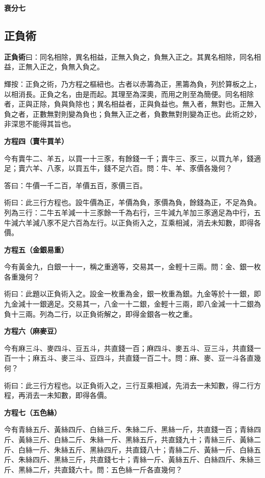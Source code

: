 \documentclass[11pt,a4paper]{article}
\newenvironment{problemenv}[1]{%
  \medskip\noindent\textbf{#1}\par\nopagebreak\smallskip
}{\medskip}
\begin{document}
\begin{problemenv}{衰分七}
\subsection{正負術}

\textbf{正負術}曰：同名相除，異名相益，正無入負之，負無入正之。其異名相除，同名相益，正無入正之，負無入負之。

輝按：正負之術，乃方程之樞紐也。古者以赤籌為正，黑籌為負，列於算板之上，以相消長。正負之名，由是而起。其理至為深奧，而用之則至為簡便。同名相除者，正與正除，負與負除也；異名相益者，正與負益也。無入者，無對也。正無入負之者，正數無對則變為負也；負無入正之者，負數無對則變為正也。此術之妙，非深思不能得其旨也。

\begin{problemenv}{方程四（賣牛買羊）}
今有賣牛二、羊五，以買一十三豕，有餘錢一千；賣牛三、豕三，以買九羊，錢適足；賣六羊、八豕，以買五牛，錢不足六百。問：牛、羊、豕價各幾何？

\textsf{答曰：}牛價一千二百，羊價五百，豕價三百。

\textsf{術曰：}此三行方程也。設牛價為正，羊價為負，豕價為負，餘錢為正，不足為負。列為三行：二牛五羊減一十三豕餘一千為右行，三牛減九羊加三豕適足為中行，五牛減六羊減八豕不足六百為左行。以正負術入之，互乘相減，消去未知數，即得各價。
\end{problemenv}

\begin{problemenv}{方程五（金銀易重）}
今有黃金九，白銀一十一，稱之重適等，交易其一，金輕十三兩。問：金、銀一枚各重幾何？

\textsf{術曰：}此題以正負術入之。設金一枚重為金，銀一枚重為銀。九金等於十一銀，即九金減十一銀適足。交易其一，八金一十二銀，金輕十三兩，即八金減一十二銀為負十三兩。列為二行，以正負術解之，即得金銀各一枚之重。
\end{problemenv}

\begin{problemenv}{方程六（麻麥豆）}
今有麻三斗、麥四斗、豆五斗，共直錢一百；麻四斗、麥五斗、豆三斗，共直錢一百一十；麻五斗、麥三斗、豆四斗，共直錢一百二十。問：麻、麥、豆一斗各直幾何？

\textsf{術曰：}此三行方程也。以正負術入之，三行互乘相減，先消去一未知數，得二行方程，再消去一未知數，即得各價。
\end{problemenv}

\begin{problemenv}{方程七（五色絲）}
今有青絲五斤、黃絲四斤、白絲三斤、朱絲二斤、黑絲一斤，共直錢一百；青絲四斤、黃絲三斤、白絲二斤、朱絲一斤、黑絲五斤，共直錢九十；青絲三斤、黃絲二斤、白絲一斤、朱絲五斤、黑絲四斤，共直錢八十；青絲二斤、黃絲一斤、白絲五斤、朱絲四斤、黑絲三斤，共直錢七十；青絲一斤、黃絲五斤、白絲四斤、朱絲三斤、黑絲二斤，共直錢六十。問：五色絲一斤各直幾何？


\end{problemenv}
\end{problemenv}
\end{document}
